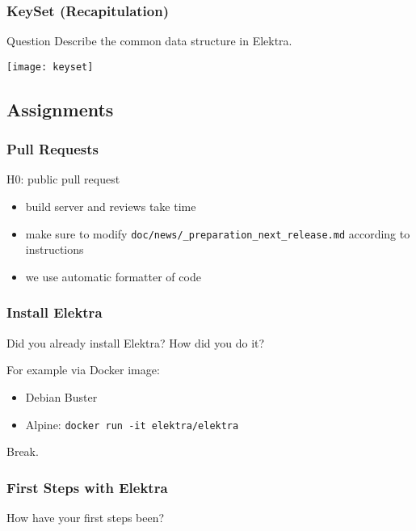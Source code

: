 \begin{frame}
	\frametitle{KeySet (Recapitulation)}

	\begin{alertblock}{Question}
	Describe the common data structure in Elektra.
	\end{alertblock}

	\vspace{1cm}
	\pause

	\texttt{[image: keyset]}
\end{frame}

\subsection{Assignments}

\begin{frame}
	\frametitle{Pull Requests}

	\begin{task}
	H0: public pull request
	\end{task}

	\begin{itemize}
	\item build server and reviews take time
	\item make sure to modify \texttt{doc/news/\_preparation\_next\_release.md} according to instructions
	\item we use automatic formatter of code
	\end{itemize}
\end{frame}

\begin{frame}
	\frametitle{Install Elektra}

	\begin{task}
	Did you already install Elektra?
	How did you do it?
	\end{task}

	For example via Docker image:
	\begin{itemize}
	\item Debian Buster
	\item Alpine: \texttt{docker run -it elektra/elektra}
	\end{itemize}
\end{frame}

\begin{assignment}
	\begin{task}
	Break.
	\end{task}
\end{assignment}

\begin{frame}
	\frametitle{First Steps with Elektra}

	\begin{task}
	How have your first steps been?
	\end{task}
\end{frame}

